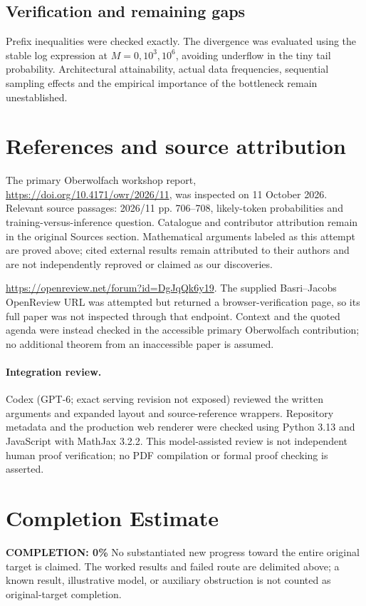 \documentclass[11pt]{article}
\begin{document}
\subsection{Verification and remaining gaps}
Prefix inequalities were checked exactly. The divergence was evaluated using the stable log expression at $M=0,10^3,10^6$, avoiding underflow in the tiny tail probability. Architectural attainability, actual data frequencies, sequential sampling effects and the empirical importance of the bottleneck remain unestablished.

\section{References and source attribution}
The primary Oberwolfach workshop report, \url{https://doi.org/10.4171/owr/2026/11}, was inspected on 11 October 2026. Relevant source passages: 2026/11 pp. 706--708, likely-token probabilities and training-versus-inference question. Catalogue and contributor attribution remain in the original Sources section. Mathematical arguments labeled as this attempt are proved above; cited external results remain attributed to their authors and are not independently reproved or claimed as our discoveries.

\url{https://openreview.net/forum?id=DgJqQk6y19}. The supplied Basri--Jacobs OpenReview URL was attempted but returned a browser-verification page, so its full paper was not inspected through that endpoint. Context and the quoted agenda were instead checked in the accessible primary Oberwolfach contribution; no additional theorem from an inaccessible paper is assumed.


\paragraph{Integration review.} Codex (GPT-6; exact serving revision not exposed) reviewed the written arguments and expanded layout and source-reference wrappers. Repository metadata and the production web renderer were checked using Python 3.13 and JavaScript with MathJax 3.2.2. This model-assisted review is not independent human proof verification; no PDF compilation or formal proof checking is asserted.

\section{Completion Estimate}
\noindent\textbf{COMPLETION: 0\%}
No substantiated new progress toward the entire original target is claimed. The worked results and failed route are delimited above; a known result, illustrative model, or auxiliary obstruction is not counted as original-target completion.
\end{document}
